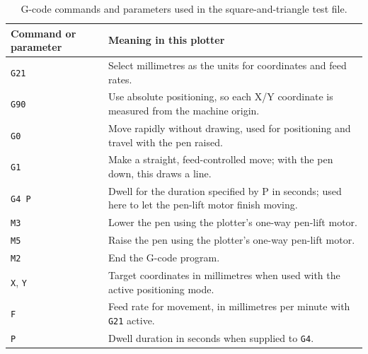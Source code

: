 \begin{table}[!htbp]
    \centering
    \begin{tabularx}{\linewidth}{|l|X|}
        \hline
        \textbf{Command or parameter} & \textbf{Meaning in this plotter} \\
        \hline
        \texttt{G21} & Select millimetres as the units for coordinates and feed rates. \\
        \hline
        \texttt{G90} & Use absolute positioning, so each X/Y coordinate is measured from the machine origin. \\
        \hline
        \texttt{G0} & Move rapidly without drawing, used for positioning and travel with the pen raised. \\
        \hline
        \texttt{G1} & Make a straight, feed-controlled move; with the pen down, this draws a line. \\
        \hline
        \texttt{G4 P} & Dwell for the duration specified by P in seconds; used here to let the pen-lift motor finish moving. \\
        \hline
        \texttt{M3} & Lower the pen using the plotter's one-way pen-lift motor. \\
        \hline
        \texttt{M5} & Raise the pen using the plotter's one-way pen-lift motor. \\
        \hline
        \texttt{M2} & End the G-code program. \\
        \hline
        \texttt{X}, \texttt{Y} & Target coordinates in millimetres when used with the active positioning mode. \\
        \hline
        \texttt{F} & Feed rate for movement, in millimetres per minute with \texttt{G21} active. \\
        \hline
        \texttt{P} & Dwell duration in seconds when supplied to \texttt{G4}. \\
        \hline
    \end{tabularx}
    \caption{G-code commands and parameters used in the square-and-triangle test file.}
    \label{tab:gcode-command-meanings}
\end{table}


\FloatBarrier
